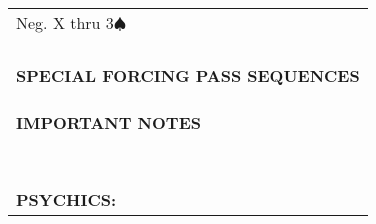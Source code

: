 \documentclass{article}
\renewcommand\S{\ensuremath{\spadesuit}}
\begin{document}
\begin{minipage}{90mm}
\begin{tabular}{| p{88mm} |}
		\\ \hline
		\\ \hline
                Neg. X thru 3\S\
		\\ \hline
		\\ \hline
		\\ \hline
		\\ \hline
		\\ \hline
		\textbf{SPECIAL FORCING PASS SEQUENCES} \\ \hline
		\\ \hline
		\\ \hline
		\\ \hline
		\textbf{IMPORTANT NOTES} \\ \hline
		\\ \hline
		\\ \hline
		\\ \hline
		\\ \hline
		\\ \hline
		\\ \hline
		\\ \hline
		\\ \hline
		\textbf{PSYCHICS:} \\ \hline
	\end{tabular}
\end{minipage}
\end{document}
